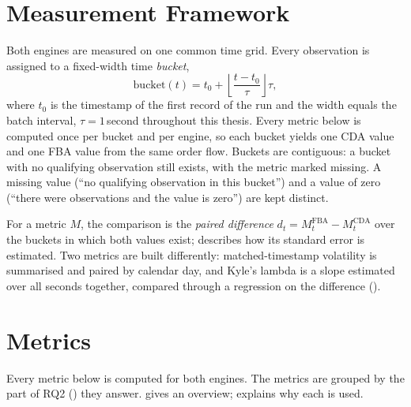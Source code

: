 \section{Measurement Framework}
\label{sec:measurement}

Both engines are measured on one common time grid. Every observation is
assigned to a fixed-width time \emph{bucket},
\begin{equation}
  \label{eq:bucket}
  \mathrm{bucket}(t) = t_0 + \left\lfloor \frac{t - t_0}{\tau} \right\rfloor \tau,
\end{equation}
where $t_0$ is the timestamp of the first record of the run and the
width equals the batch interval, $\tau = 1$\,second throughout this
thesis. Every metric below is computed once per bucket and per engine, so
each bucket yields one CDA value and one FBA value from the same order
flow. Buckets are contiguous: a bucket with no qualifying observation
still exists, with the metric marked missing. A missing value (``no
qualifying observation in this bucket'') and a value of zero (``there were
observations and the value is zero'') are kept distinct.

For a metric $M$, the comparison is the
\emph{paired difference} $d_t = M^{\mathrm{FBA}}_t - M^{\mathrm{CDA}}_t$
over the buckets in which both values exist; 
describes how its standard error is estimated. Two metrics are built
differently: matched-timestamp volatility is summarised and paired by
calendar day, and Kyle's lambda is a slope estimated over all seconds
together, compared through a regression on the difference
().

\section{Metrics}
\label{sec:metricdefs}

Every metric below is computed for both engines. The metrics are grouped
by the part of RQ2 () they answer.  gives an
overview;  explains why each is used.

